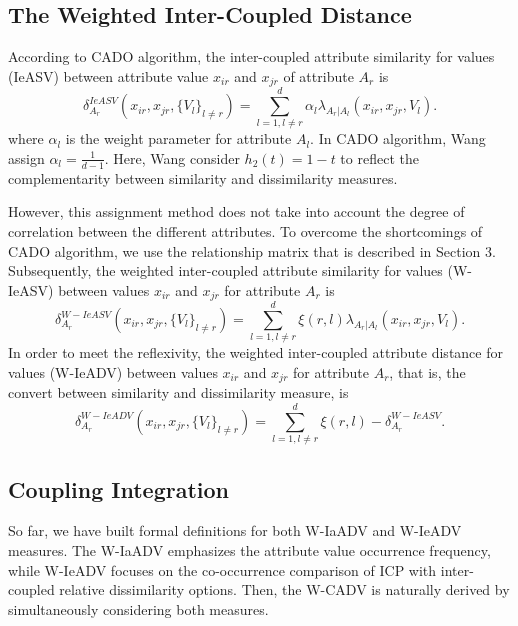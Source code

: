 \documentclass[review]{elsarticle}
\begin{document}
\subsection{The Weighted Inter-Coupled Distance}
According to CADO algorithm, the inter-coupled attribute similarity for values (IeASV) between attribute value $x_{ir}$ and $x_{jr}$ of attribute $A_r$ is
\begin{equation}
\delta_{A_r}^{IeASV}(x_{ir},x_{jr},\{V_l\}_{l \neq r}) = \sum_{l=1,l \neq r}^{d} \alpha_l \lambda_{A_r|A_l}(x_{ir},x_{jr},V_l).
\label{equ17}
\end{equation}
where $\alpha_l$ is the weight parameter for attribute $A_l$. In CADO algorithm, Wang assign $\alpha_l = \frac{1}{d-1}$. Here, Wang consider $h_2(t) = 1 - t$ to reflect the complementarity between similarity and dissimilarity measures.

However, this assignment method does not take into account the degree of correlation between the different attributes. To overcome the shortcomings of CADO algorithm, we use the relationship matrix that is described in Section 3.
Subsequently, the weighted inter-coupled attribute similarity for values (W-IeASV) between values $x_{ir}$ and $x_{jr}$ for attribute $A_r$ is
\begin{equation}
\delta_{A_r}^{W-IeASV}(x_{ir},x_{jr},\{V_l\}_{l \neq r}) = \sum_{l=1,l \neq r}^{d} \xi(r,l) \lambda_{A_r|A_l}(x_{ir},x_{jr},V_l).
\label{equ18}
\end{equation}
In order to meet the reflexivity, the weighted inter-coupled attribute distance for values (W-IeADV) between values $x_{ir}$ and $x_{jr}$ for attribute $A_r$, that is, the convert between similarity and dissimilarity measure, is
\begin{equation}
\delta_{A_r}^{W-IeADV}(x_{ir},x_{jr},\{V_l\}_{l \neq r}) = \sum_{l=1,l \neq r}^{d} \xi(r,l) - \delta_{A_r}^{W-IeASV}.
\label{equ19}
\end{equation}

\subsection{Coupling Integration}
So far, we have built formal definitions for both W-IaADV and W-IeADV measures. The W-IaADV emphasizes the attribute value occurrence frequency, while W-IeADV focuses on the co-occurrence comparison of ICP with inter-coupled relative dissimilarity options. Then, the W-CADV is naturally derived by simultaneously considering both measures.
\end{document}
